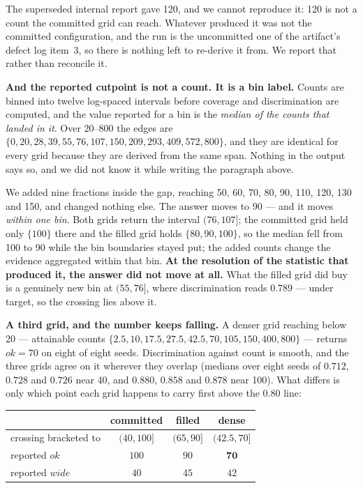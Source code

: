 \iffull
The superseded internal report gave 120, and we cannot reproduce it: 120 is not
a count the committed grid can reach. Whatever produced it was not the committed
configuration, and the run is the uncommitted one of
the artifact's defect log item~3, so there is nothing left to re-derive it
from. We report that rather than reconcile it.
\fi

\textbf{And the reported cutpoint is not a count. It is a bin label.} Counts are
binned into twelve log-spaced intervals before coverage and discrimination are
computed, and the value reported for a bin is the \emph{median of the counts
that landed in it}. Over $20$--$800$ the edges are $\{0, 20, 28, 39, 55, 76,
107, 150, 209, 293, 409, 572, 800\}$, and they are identical for every grid
because they are derived from the same span. Nothing in the output says so, and
we did not know it while writing the paragraph above.

We added nine fractions inside the gap, reaching 50, 60, 70, 80, 90, 110, 120,
130 and 150, and changed nothing else. The answer moves to 90 --- and it moves
\emph{within one bin}. Both grids return the interval $(76, 107]$; the committed
grid held only $\{100\}$ there and the filled grid holds $\{80, 90, 100\}$, so
the median fell from 100 to 90 while the bin boundaries stayed put; the added counts change the evidence
aggregated within that bin. \textbf{At the resolution of the statistic that produced it, the answer did
not move at all.} What the filled grid did buy is a genuinely new bin at
$(55, 76]$, where discrimination reads $0.789$ --- under target, so the crossing
lies above it.

\textbf{A third grid, and the number keeps falling.} A denser grid reaching
below 20 --- attainable counts $\{2.5, 10, 17.5, 27.5, 42.5, 70, 105, 150, 400,
800\}$ --- returns $ok = 70$ on eight of eight seeds. Discrimination against
count is smooth, and the three grids agree on it wherever they overlap
(medians over eight seeds of $0.712$, $0.728$ and $0.726$ near 40, and $0.880$,
$0.858$ and $0.878$ near 100). What
differs is only which point each grid happens to carry first above the $0.80$
line:

\begin{center}\small
\begin{tabular}{@{}lccc@{}}
\toprule
 & \textbf{committed} & \textbf{filled} & \textbf{dense} \\
\midrule
crossing bracketed to & $(40, 100]$ & $(65, 90]$ & $(42.5, 70]$ \\
reported $ok$ & $100$ & $90$ & $\mathbf{70}$ \\
reported $wide$ & $40$ & $45$ & $42$ \\
\bottomrule
\end{tabular}
\end{center}

